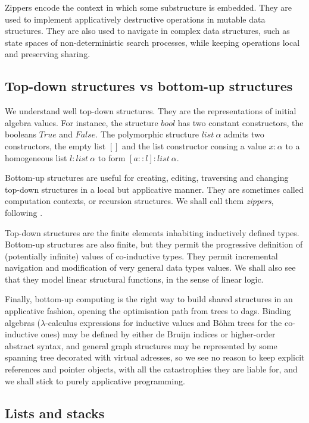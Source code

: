 \documentclass[12pt]{article}
\begin{document}
Zippers encode the context in which some substructure is embedded.
They are used to implement applicatively destructive operations in
mutable data structures. They are also used to navigate in complex data
structures, such as state spaces of non-deterministic search processes,
while keeping operations local and preserving sharing.

\subsection{Top-down structures vs bottom-up structures}

We understand well top-down structures. They are the representations of
initial algebra values. For instance, the structure $bool$ has two
constant constructors, the booleans $True$ and $False$. 
The polymorphic structure
$list~\alpha$ admits two constructors, the empty list $[]$ and the
list constructor consing a value $x:\alpha$ to a homogeneous
list $l:list~\alpha$ to form $[a::l]:list~\alpha$. 

Bottom-up structures are useful for creating, editing, traversing and 
changing top-down structures in a local but applicative manner.
They are sometimes called computation contexts, or recursion structures.
We shall call them {\sl zippers}, following \cite{zipper}. 

Top-down structures are the finite elements inhabiting inductively
defined types. Bottom-up structures are also finite, but they permit 
the progressive definition of (potentially infinite) values of co-inductive 
types. They permit incremental navigation and modification of very general
data types values. We shall also see that they model linear structural
functions, in the sense of linear logic.

Finally, bottom-up computing is the right way to build shared structures
in an applicative fashion, opening the optimisation path from trees to dags.
Binding algebras ($\lambda$-calculus expressions for inductive values
and B\"ohm trees for the co-inductive ones) may be defined by either 
de Bruijn indices or higher-order abstract syntax, and general graph structures
may be represented by some spanning tree decorated with virtual adresses,
so we see no reason to keep explicit references and pointer objects, with
all the catastrophies they are liable for, and we shall stick to purely
applicative programming.

\subsection{Lists and stacks}
\end{document}
